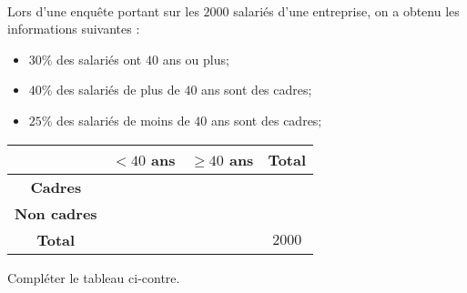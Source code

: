 \documentclass[11pt]{article}
\begin{document}
\begin{exo}~\\
\begin{minipage}{.5\textwidth}
  Lors d'une enquête portant sur les $2000$ salariés d'une entreprise, on a
  obtenu les informations suivantes :
\begin{itemize}
  \item $30$\% des salariés ont $40$ ans ou plus;
  \item $40$\% des salariés de plus de $40$ ans sont des cadres;
  \item $25$\% des salariés de moins de $40$ ans sont des cadres;
\end{itemize}
\end{minipage}
\begin{minipage}{.5\textwidth}
  \begin{center}
    \def\arraystretch{1.75}
 \begin{tabular}{|c|c|c|c|}
   \hline
  & \textbf{$<40$ ans} & \textbf{$\geq40$ ans} & \textbf{Total} \\
   \hline
  \textbf{Cadres} &  &  &  \\
   \hline
  \textbf{Non cadres} &  &  &  \\
   \hline
  \textbf{Total} &  & & $2000$ \\
   \hline
\end{tabular}
  \end{center}
\end{minipage}
Compléter le tableau ci-contre.
\end{exo}
\end{document}
